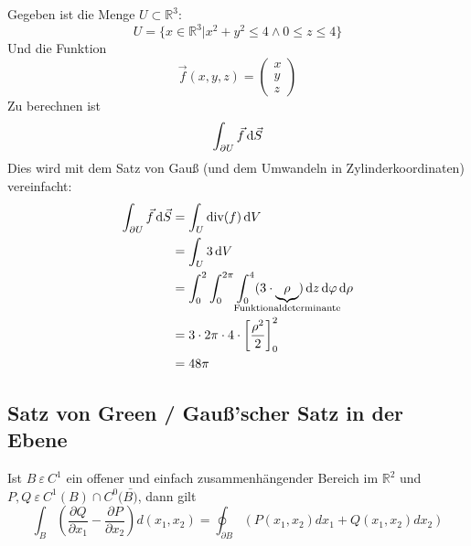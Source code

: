 
Gegeben ist die Menge $U \subset \mathbb{R}^3$:
\begin{equation*}
    U=\{x\in \mathbb{R}^3 | x^2+y^2\leq 4 \wedge 0\leq z \leq 4\}
\end{equation*}
Und die Funktion
\begin{equation*}
    \vec{f}(x,y,z)=\begin{pmatrix}x\\y\\z\end{pmatrix}
\end{equation*}
Zu berechnen ist
\begin{equation*}
    \int_{\partial U} \vec{f} \mathop{}\!\mathrm{d} \vec{S}
\end{equation*}
Dies wird mit dem Satz von Gauß (und dem Umwandeln in Zylinderkoordinaten) vereinfacht:
\begin{equation*}
    \begin{split}
        \int_{\partial U} \vec{f} \diff \vec{S} & = \int_U \text{div}(f) \diff V \\
        & = \int_U 3 \diff V \\
        & = \int_0^2 \int_0^{2\pi} \int_0^4 (3 \cdot \underbrace{\rho}_{\mathclap{\text{Funktionaldeterminante}}})  \diff z \diff \varphi \diff \rho \\
        & = 3 \cdot 2\pi \cdot 4 \cdot \left[\frac{\rho^2}{2}\right]_0^2 \\
        & = 48\pi
    \end{split}
\end{equation*}



\subsection{Satz von Green / Gauß'scher Satz in der Ebene}
Ist $B \ \varepsilon \ C^1$ ein offener und einfach zusammenhängender Bereich im $\mathbb{R}^2$ und $P,Q \ \varepsilon \ C^1(B)\cap C^0(\bar{B)}$, dann gilt \\
\begin{equation}
    \int_B (\frac{\partial Q}{\partial x_1} - \frac{\partial P}{\partial x_2})d(x_1,x_2) = \oint_{\partial B} (P(x_1,x_2)dx_1 + Q(x_1,x_2)dx_2)
\end{equation}

